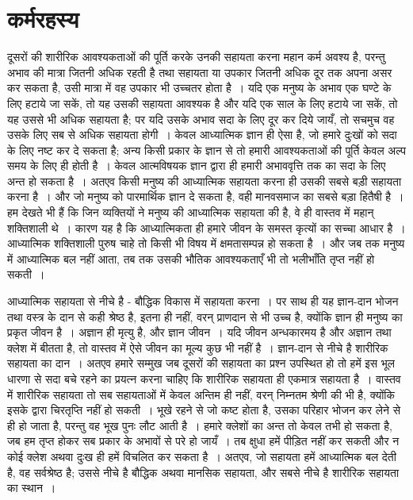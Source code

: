 
\chapter{कर्मरहस्य}

दूसरों की शारीरिक आवश्यकताओं की पूर्ति करके उनकी सहायता करना महान कर्म अवश्य है, परन्तु अभाव की मात्रा जितनी अधिक रहती है तथा सहायता या उपकार जितनी अधिक दूर तक अपना असर कर सकता है, उसी मात्रा में वह उपकार भी उच्चतर होता है~। यदि एक मनुष्य के अभाव एक घण्टे के लिए हटाये जा सकें, तो यह उसकी सहायता आवश्यक है और यदि एक साल के लिए हटाये जा सकें, तो यह उससे भी अधिक सहायता है; पर यदि उसके अभाव सदा के लिए दूर कर दिये जायँ, तो सचमुच वह उसके लिए सब से अधिक सहायता होगी~। केवल आध्यात्मिक ज्ञान ही ऐसा है, जो हमारे दुःखों को सदा के लिए नष्ट कर दे सकता है; अन्य किसी प्रकार के ज्ञान से तो हमारी आवश्यकताओं की पूर्ति केवल अल्प समय के लिए ही होती है~। केवल आत्मविषयक ज्ञान द्वारा ही हमारी अभाववृत्ति तक का सदा के लिए अन्त हो सकता है~। अतएव किसी मनुष्य की आध्यात्मिक सहायता करना ही उसकी सबसे बड़ी सहायता करना है~। और जो मनुष्य को पारमार्थिक ज्ञान दे सकता है, वही मानवसमाज का सबसे बड़ा हितैषी है~। हम देखते भी हैं कि जिन व्यक्तियों ने मनुष्य की आध्यात्मिक सहायता की है, वे ही वास्तव में महान् शक्तिशाली थे~। कारण यह है कि आध्यात्मिकता ही हमारे जीवन के समस्त कृत्यों का सच्चा आधार है~। आध्यात्मिक शक्तिशाली पुरुष चाहे तो किसी भी विषय में क्षमतासम्पन्न हो सकता है~। और जब तक मनुष्य में आध्यात्मिक बल नहीं आता, तब तक उसकी भौतिक आवश्यकताएँ भी तो भलीभाँति तृप्त नहीं हो सकती~।

आध्यात्मिक सहायता से नीचे है - बौद्धिक विकास में सहायता करना~। पर साथ ही यह ज्ञान-दान भोजन तथा वस्त्र के दान से कही श्रेष्ठ है, इतना ही नहीं, वरन् प्राणदान से भी उच्च है, क्योंकि ज्ञान ही मनुष्य का प्रकृत जीवन है~। अज्ञान ही मृत्यु है, और ज्ञान जीवन~। यदि जीवन अन्धकारमय है और अज्ञान तथा क्लेश में बीतता है, तो वास्तव में ऐसे जीवन का मूल्य कुछ भी नहीं है~। ज्ञान-दान से नीचे है शारीरिक सहायता का दान~। अतएव हमारे सम्मुख जब दूसरों की सहायता का प्रश्न उपस्थित हो तो हमें इस भूल धारणा से सदा बचे रहने का प्रयत्न करना चाहिए कि शारीरिक सहायता ही एकमात्र सहायता है~। वास्तव में शारीरिक सहायता तो सब सहायताओं में केवल अन्तिम ही नहीं, वरन् निम्नतम श्रेणी की भी है, क्योंकि इसके द्वारा चिरतृप्ति नहीं हो सकती~। भूखे रहने से जो कष्ट होता है, उसका परिहार भोजन कर लेने से ही हो जाता है, परन्तु वह भूख पुनः लौट आती है~। हमारे क्लेशों का अन्त तो केवल तभी हो सकता है, जब हम तृप्त होकर सब प्रकार के अभावों से परे हो जायँ~। तब क्षुधा हमें पीड़ित नहीं कर सकती और न कोई क्लेश अथवा दुःख ही हमें विचलित कर सकता है~। अतएव, जो सहायता हमें आध्यात्मिक बल देती है, वह सर्वश्रेष्ठ है; उससे नीचे है बौद्धिक अथवा मानसिक सहायता, और सबसे नीचे है शारीरिक सहायता का स्थान~।

